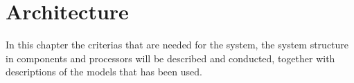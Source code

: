 \chapter{Architecture} \label{Architecture}
In this chapter the criterias that are needed for the system, the system structure in components and processors will be described and conducted, together with descriptions of the models that has been used.




